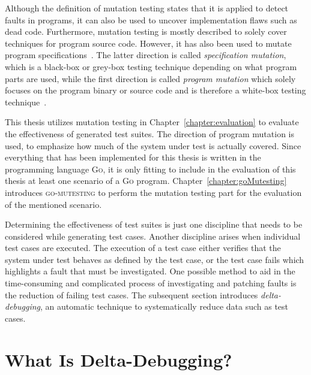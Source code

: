 Although the definition of mutation testing states that it is applied to detect faults in programs, it can also be used to uncover implementation flaws such as dead code. Furthermore, mutation testing is mostly described to solely cover techniques for program source code. However, it has also been used to mutate program specifications~\cite{jia2011analysis}. The latter direction is called \emph{specification mutation}, which is a black-box or grey-box testing technique depending on what program parts are used, while the first direction is called \emph{program mutation} which solely focuses on the program binary or source code and is therefore a white-box testing technique~\cite{jia2011analysis}.

This thesis utilizes mutation testing in Chapter~\ref{chapter:evaluation} to evaluate the effectiveness of generated test suites. The direction of program mutation is used, to emphasize how much of the system under test is actually covered. Since everything that has been implemented for this thesis is written in the programming language \textsc{Go}, it is only fitting to include in the evaluation of this thesis at least one scenario of a \textsc{Go} program. Chapter~\ref{chapter:goMutesting} introduces \textsc{go-mutesting} to perform the mutation testing part for the evaluation of the mentioned scenario.

Determining the effectiveness of test suites is just one discipline that needs to be considered while generating test cases. Another discipline arises when individual test cases are executed. The execution of a test case either verifies that the system under test behaves as defined by the test case, or the test case fails which highlights a fault that must be investigated. One possible method to aid in the time-consuming and complicated process of investigating and patching faults is the reduction of failing test cases. The subsequent section introduces \emph{delta-debugging}, an automatic technique to systematically reduce data such as test cases.

\section{What Is Delta-Debugging?}
\label{sec:whatIsDeltaDebugging}

